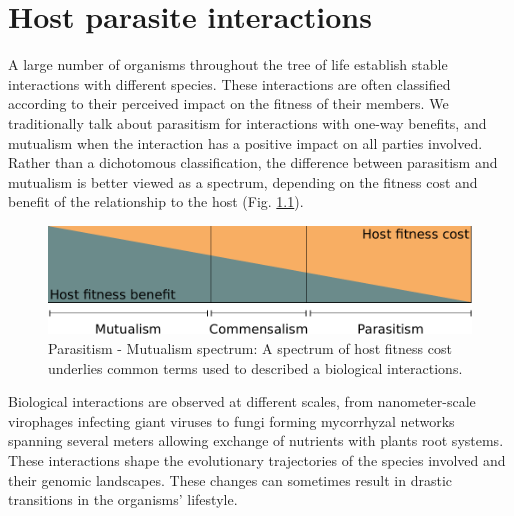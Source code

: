 
\chapter{Host parasite interactions} %

\label{ch:01-01} %


A large number of organisms throughout the tree of life establish stable interactions with different species. These interactions are often classified according to their perceived impact on the fitness of their members. We traditionally talk about parasitism for interactions with one-way benefits, and mutualism when the interaction has a positive impact on all parties involved. Rather than a dichotomous classification, the difference between parasitism and mutualism is better viewed as a spectrum, depending on the \Gls{fitness} cost and benefit of the relationship to the host (Fig. \ref{fig:01-01:mutualism}).

\begin{figure}[b]
    \includegraphics[width=\textwidth]{Parts/Part01/gfx/parasitism_mutualism.pdf}
    \caption{Parasitism - Mutualism spectrum: A spectrum of host \Gls{fitness} cost underlies common terms used to described a biological interactions.}
	\label{fig:01-01:mutualism}
\end{figure}

Biological interactions are observed at different scales, from nanometer-scale virophages infecting giant viruses to fungi forming mycorrhyzal networks spanning several meters \citep{Johnson1997,Selosse2006} allowing exchange of nutrients with plants root systems. These interactions shape the evolutionary trajectories of the species involved and their genomic landscapes. These changes can sometimes result in drastic transitions in the organisms' lifestyle. 

